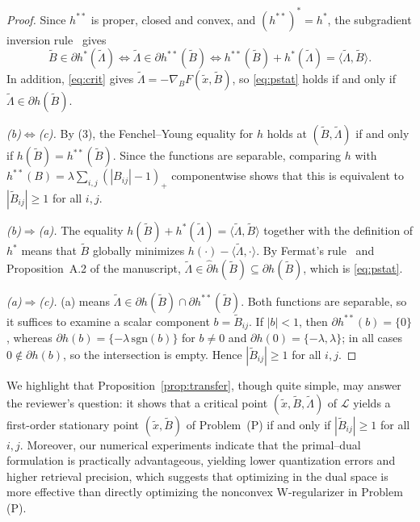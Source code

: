 \documentclass[11pt]{article}
\begin{document}
\begin{proof} 
Since $h^{**}$ is proper, closed and convex, and $(h^{**})^*=h^*$, the
subgradient inversion rule~\cite[Theorem~23.5]{rockafellar1970convex} gives
\[
\widetilde{B}\in\partial h^*(\widetilde{\Lambda})
\iff
\widetilde{\Lambda}\in\partial h^{**}(\widetilde{B})
\iff
h^{**}(\widetilde{B})+h^*(\widetilde{\Lambda})
=\langle\widetilde{\Lambda},\widetilde{B}\rangle.
\tag{3}
\]
In addition, \eqref{eq:crit} gives
$\widetilde{\Lambda}=-\nabla_B F(\tilde{x},\widetilde{B})$, so
\eqref{eq:pstat} holds if and only if
$\widetilde{\Lambda}\in\partial h(\widetilde{B})$.

\emph{(b)$\iff$(c).} By (3), the Fenchel--Young equality for $h$ holds at
$(\widetilde{B},\widetilde{\Lambda})$ if and only if
$h(\widetilde{B})=h^{**}(\widetilde{B})$. Since the functions are separable,
comparing $h$ with $h^{**}(B)=\lambda\sum_{i,j}(|B_{ij}|-1)_+$ componentwise
shows that this is equivalent to $|\widetilde{B}_{ij}|\ge1$ for all $i,j$.

\emph{(b)$\Rightarrow$(a).} The equality
$h(\widetilde{B})+h^*(\widetilde{\Lambda})
=\langle\widetilde{\Lambda},\widetilde{B}\rangle$ together with the
definition of $h^*$ means that $\widetilde{B}$ globally minimizes
$h(\cdot)-\langle\widetilde{\Lambda},\cdot\rangle$. By Fermat's
rule~\cite[Theorem~10.1]{rockafellar1998variational} and Proposition~A.2 of
the manuscript, $\widetilde{\Lambda}\in\widehat{\partial}h(\widetilde{B})
\subseteq\partial h(\widetilde{B})$, which is \eqref{eq:pstat}.

\emph{(a)$\Rightarrow$(c).}  (a) means
$\widetilde{\Lambda}\in\partial h(\widetilde{B})
\cap\partial h^{**}(\widetilde{B})$. Both functions are separable, so it
suffices to examine a scalar component $b=\widetilde{B}_{ij}$. If $|b|<1$,
then $\partial h^{**}(b)=\{0\}$, whereas
$\partial h(b)=\{-\lambda\,\mathrm{sgn}(b)\}$ for $b\neq0$ and
$\partial h(0)=\{-\lambda,\lambda\}$; in all cases $0\notin\partial h(b)$,
so the intersection is empty. Hence $|\widetilde{B}_{ij}|\ge1$ for all $i,j$.
\end{proof}

We highlight that Proposition~\ref{prop:transfer}, though quite simple, may answer the reviewer's question: it shows that a critical point $(\tilde x,\widetilde B,\widetilde\Lambda)$ of $\mathcal{L}$ yields a first-order stationary point $(\tilde x,\widetilde B)$ of Problem~(P) if and
only if $|\widetilde B_{ij}|\ge1$ for all $i,j$. Moreover, our numerical experiments indicate that the primal--dual formulation is practically
advantageous, yielding lower quantization errors and higher retrieval
precision, which suggests that optimizing in the dual space is more effective than directly optimizing the nonconvex W-regularizer in Problem (P).
\end{document}
